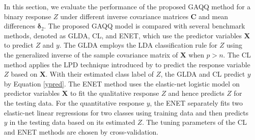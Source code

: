 \documentclass[12pt]{article}
\begin{document}
In this section, we evaluate the performance of the proposed GAQQ method for a binary response $Z$ under different inverse covariance matrices $\bm C$ and mean differences $\bm \delta_2$.
The proposed GAQQ model is compared with several benchmark methods, denoted as GLDA, CL, and ENET, which use the predictor variables $\bm X$ to predict $Z$ and $y$.
The GLDA employs the LDA classification rule for $Z$ using the generalized inverse of the sample covariance matrix of $\bm X$ when $p > n$.
The CL method applies the LPD technique introduced by \cite{cai2012a} to predict the response variable $Z$ based on $\bm X$.
With their estimated class label of $Z$, the GLDA and CL predict $y$ by Equation \eqref{ypred}.
The ENET method uses the elastic-net logistic model \citep{zou2005regularization} on predictor variables $\bm X$ to fit the qualitative response $Z$ and hence predicts $Z$ for the testing data.
For the quantitative response $y$, the ENET separately fits two elastic-net linear regressions for two classes using training data and then predicts $y$ in the testing data based on its estimated $Z$.
The tuning parameters of the CL and ENET methods are chosen by cross-validation.
\end{document}
